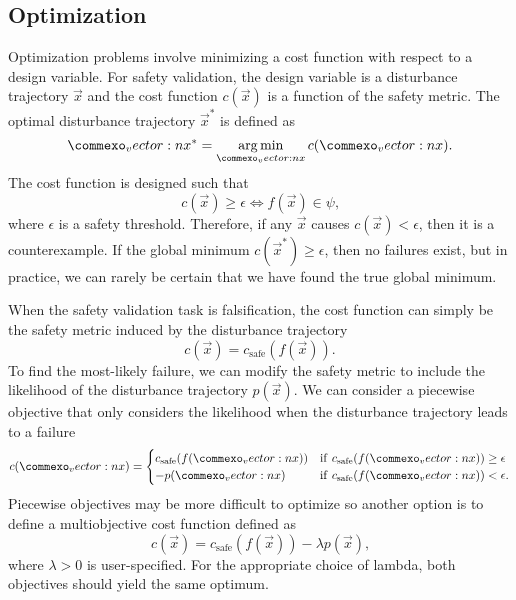 \subsection{Optimization}

Optimization problems involve minimizing a cost function with respect to a design variable. For safety validation, the design variable is a disturbance trajectory $\vec{x}$ and the cost function $c(\vec{x})$ is a function of the safety metric. The optimal disturbance trajectory $\vec{x}^*$ is defined as
\begin{equation}
    \vec{x}^* = \argmin_{\vec{x}} c(\vec{x}) \text{.}
\end{equation}
The cost function is designed such that 
\begin{equation}
    c(\vec{x}) \geq \epsilon \iff f(\vec{x}) \in \psi \text{,}
\end{equation} 
where $\epsilon$ is a safety threshold. Therefore, if any $\vec{x}$ causes $c(\vec{x}) < \epsilon$, then it is a counterexample. If the global minimum $c(\vec{x}^*) \geq \epsilon$, then no failures exist, but in practice, we can rarely be certain that we have found the true global minimum. 

When the safety validation task is falsification, the cost function can simply be the safety metric induced by the disturbance trajectory
\begin{equation}
    c(\vec{x}) = c_{\text{safe}}(f(\vec{x})) \text{.}
\end{equation}
To find the most-likely failure, we can modify the safety metric to include the likelihood of the disturbance trajectory $p(\vec{x})$. We can consider a piecewise objective that only considers the likelihood when the disturbance trajectory leads to a failure
\begin{equation}
    c(\vec{x}) = \begin{cases}
        c_{\text{safe}}(f(\vec{x}))  & {\rm if} \ c_{\text{safe}}(f(\vec{x})) \geq \epsilon \\
        -p(\vec{x}) & {\rm if} \ c_{\text{safe}}(f(\vec{x})) < \epsilon \text{.} \label{eq:piecewise_cost}
    \end{cases}
\end{equation}
Piecewise objectives may be more difficult to optimize so another option is to define a multiobjective cost function defined as
\begin{equation}
    c(\vec{x}) = c_{\text{safe}}(f(\vec{x})) - \lambda p(\vec{x}) \text{,}
\end{equation}
where $\lambda > 0$ is user-specified. For the appropriate choice of lambda, both objectives should yield the same optimum. 

